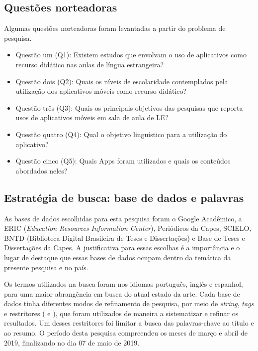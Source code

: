 \documentclass{textolivre}
\begin{document}
\subsection{Questões norteadoras}

Algumas questões norteadoras foram levantadas a partir do problema de pesquisa.

\begin{itemize}
\item Questão um (Q1): Existem estudos que envolvam o uso de aplicativos como recurso didático nas aulas de língua estrangeira?
\item Questão dois (Q2): Quais os níveis de escolaridade contemplados pela utilização dos aplicativos móveis como recurso didático?
\item Questão três (Q3): Quais os principais objetivos das pesquisas que reporta usos de aplicativos móveis em sala de aula de LE? 
\item Questão quatro (Q4): Qual o objetivo linguístico para a utilização do aplicativo?
\item Questão cinco (Q5): Quais Apps foram utilizados e quais os conteúdos abordados neles?
\end{itemize}

\subsection{Estratégia de busca: base de dados e palavras}
As bases de dados escolhidas para esta pesquisa foram o Google Acadêmico, a ERIC (\emph{Education Resources Information Center}), Periódicos da Capes, SCIELO, BNTD (Biblioteca Digital Brasileira de Teses e Dissertações) e Base de Teses e Dissertações da Capes. A justificativa para essas escolhas é a importância e o lugar de destaque que essas bases de dados ocupam dentro da temática da presente pesquisa e no país. 

Os termos utilizados na busca foram nos idiomas português, inglês e espanhol, para uma maior abrangência em busca do atual estado da arte. Cada base de dados tinha diferentes modos de refinamento de pesquisa, por meio de \textit{string}, \textit{tags} e restritores ( e ), que foram utilizados de maneira a sistematizar e refinar os resultados. Um desses restritores foi limitar a busca das palavras-chave ao título e ao resumo. O período desta pesquisa compreendeu os meses de março e abril de 2019, finalizando no dia 07 de maio de 2019. 
\end{document}
